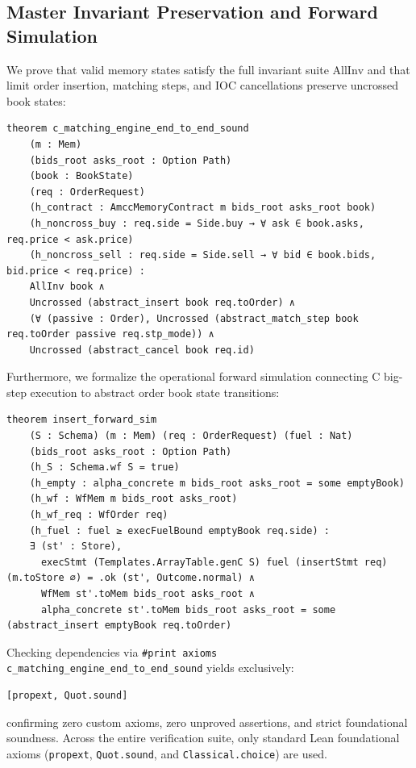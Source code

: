 \documentclass[11pt,a4paper]{article}
\begin{document}
\subsection{Master Invariant Preservation and Forward Simulation}

We prove that valid memory states satisfy the full invariant suite $\mathrm{AllInv}$ and that limit order insertion, matching steps, and IOC cancellations preserve uncrossed book states:

\begin{lstlisting}[language=lean4]
theorem c_matching_engine_end_to_end_sound
    (m : Mem)
    (bids_root asks_root : Option Path)
    (book : BookState)
    (req : OrderRequest)
    (h_contract : AmccMemoryContract m bids_root asks_root book)
    (h_noncross_buy : req.side = Side.buy → ∀ ask ∈ book.asks, req.price < ask.price)
    (h_noncross_sell : req.side = Side.sell → ∀ bid ∈ book.bids, bid.price < req.price) :
    AllInv book ∧
    Uncrossed (abstract_insert book req.toOrder) ∧
    (∀ (passive : Order), Uncrossed (abstract_match_step book req.toOrder passive req.stp_mode)) ∧
    Uncrossed (abstract_cancel book req.id)
\end{lstlisting}

Furthermore, we formalize the operational forward simulation connecting C big-step execution to abstract order book state transitions:
\begin{lstlisting}[language=lean4]
theorem insert_forward_sim
    (S : Schema) (m : Mem) (req : OrderRequest) (fuel : Nat)
    (bids_root asks_root : Option Path)
    (h_S : Schema.wf S = true)
    (h_empty : alpha_concrete m bids_root asks_root = some emptyBook)
    (h_wf : WfMem m bids_root asks_root)
    (h_wf_req : WfOrder req)
    (h_fuel : fuel ≥ execFuelBound emptyBook req.side) :
    ∃ (st' : Store),
      execStmt (Templates.ArrayTable.genC S) fuel (insertStmt req) (m.toStore ∅) = .ok (st', Outcome.normal) ∧
      WfMem st'.toMem bids_root asks_root ∧
      alpha_concrete st'.toMem bids_root asks_root = some (abstract_insert emptyBook req.toOrder)
\end{lstlisting}

\noindent Checking dependencies via \texttt{\#print axioms c\_matching\_engine\_end\_to\_end\_sound} yields exclusively:
\begin{lstlisting}[language={}]
[propext, Quot.sound]
\end{lstlisting}
confirming zero custom axioms, zero unproved assertions, and strict foundational soundness. Across the entire verification suite, only standard Lean foundational axioms (\texttt{propext}, \texttt{Quot.sound}, and \texttt{Classical.choice}) are used.
\end{document}
